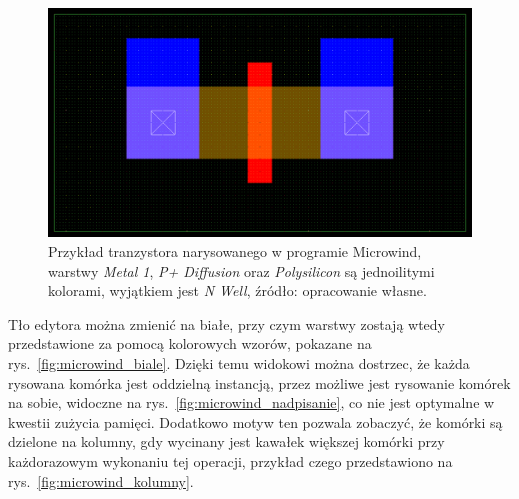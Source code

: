 \begin{figure}[h]
    \centering
    \includegraphics[width=.9\textwidth]{chapters/chapter2/img/microwind_tran}
    \caption[Przykład tranzystora narysowanego w programie Microwind.]
    {
        Przykład tranzystora narysowanego w programie Microwind,
        warstwy \textit{Metal 1}, \textit{P+ Diffusion} oraz \textit{Polysilicon} są jednoilitymi kolorami,
        wyjątkiem jest \textit{N Well},
        źródło: opracowanie własne.
    }
    \label{fig:microwind_tran}
\end{figure}

Tło edytora można zmienić na białe, przy czym warstwy zostają wtedy przedstawione za pomocą kolorowych wzorów,
pokazane na rys.~\ref{fig:microwind_biale}.
Dzięki temu widokowi można dostrzec, że każda rysowana komórka jest oddzielną instancją,
przez możliwe jest rysowanie komórek na sobie,
widoczne na rys.~\ref{fig:microwind_nadpisanie}, co nie jest optymalne w kwestii zużycia pamięci.
Dodatkowo motyw ten pozwala zobaczyć, że komórki są dzielone na kolumny,
gdy wycinany jest kawałek większej komórki przy każdorazowym wykonaniu tej operacji,
przykład czego przedstawiono na rys.~\ref{fig:microwind_kolumny}.

